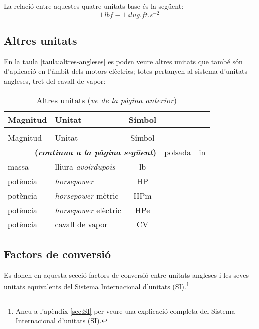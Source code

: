 La relació entre aquestes quatre unitats base és la següent:
\begin{equation}
    \qty{1}{lbf} \equiv \qty{1}{slug.ft.s^{-2}}
\end{equation}

\subsection{Altres unitats}

En la taula \vref{taula:altres-angleses} es poden veure altres unitats que també són d'aplicació en l'àmbit dels motors elèctrics; totes pertanyen al sistema d'unitats angleses, tret del cavall de vapor:
\begin{longtable}[h]{llc}
   \caption{\label{taula:altres-angleses}Altres unitats}\\
   \toprule[1pt]
    Magnitud & Unitat & Símbol \\
   \midrule
   \endfirsthead
   \caption[]{Altres unitats (\emph{ve de la pàgina anterior})}\\
   \toprule[1pt]
    Magnitud & Unitat & Símbol \\
   \midrule
   \endhead
   \midrule
   \multicolumn{3}{r}{\sffamily\bfseries\color{NavyBlue}(\emph{continua a la pàgina següent})}
   \endfoot
   \endlastfoot
   longitud & polsada & in \\
   massa & lliura \textit{avoirdupois} & lb \\
   potència & \textit{horsepower} & HP \\
   potència & \textit{horsepower} mètric & \unit{HPm} \\
   potència & \textit{horsepower} elèctric & \unit{HPe} \\
   potència & cavall de vapor & CV \\
   \bottomrule[1pt]
\end{longtable}
 


\subsection{Factors de conversió}

Es donen en aquesta secció factors de conversió entre unitats angleses i les seves unitats equivalents del Sistema Internacional d'unitats (SI).\footnote{Aneu a l'apèndix \ref{sec:SI} per veure una explicació completa del Sistema Internacional d'unitats (SI).}


